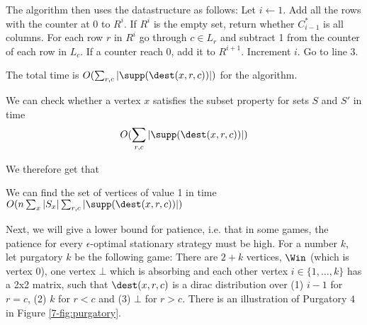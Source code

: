 The algorithm then uses the datastructure as follows:
Let $i\leftarrow 1$.
Add all the rows with the counter at 0 to $R^i$. 
If $R^i$ is the empty set, return whether $C_{i-1}^*$ is all columns.
For each row $r$ in $R^i$ go through $c\in L_r$ and subtract 1 from the counter of each row in $L_c$. If a counter reach 0, add it to $R^{i+1}$.
Increment $i$.
Go to line 3.

The total time is $O(\sum_{r,c}|\supp(\dest(x,r,c))|)$ for the algorithm.

\begin{lemma}
We can check whether a vertex $x$ satisfies the subset property for sets $S$ and $S'$ in time \[O(\sum_{r,c}|\supp(\dest(x,r,c))|)\]
\end{lemma}

We therefore get that \begin{lemma}\label{lem:val1}\label{lemm:find_1_reach}
We can find the set of vertices of value 1 in time $O(n\sum_{x} |S_x|\sum_{r,c}|\supp(\dest(x,r,c))|)$
\end{lemma}

Next, we will give a lower bound for patience, i.e. that in some games, the patience for every $\epsilon$-optimal stationary strategy must be high. 
For a number $k$, let purgatory $k$ be the following game:
There are $2+k$ vertices, $\Win$ (which is vertex 0), one vertex $\bot$ which is absorbing and each other vertex $i\in \{1,\dots, k\}$ has a 2x2 matrix, such that $\dest(x,r,c)$ is a dirac distribution over (1)
$i-1$ for $r=c$, (2) $k$ for $r<c$ and (3) $\bot$ for $r>c$.
There is an illustration of Purgatory $4$ in Figure \cref{7-fig:purgatory}. 

